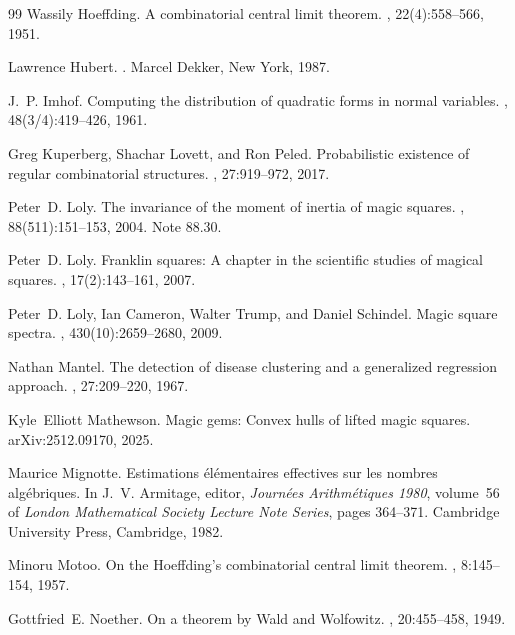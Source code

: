 \documentclass[11pt,a4paper]{article}
\theoremstyle{plain}
\theoremstyle{definition}
\theoremstyle{remark}
\begin{document}
\begin{thebibliography}{99}
Wassily Hoeffding.
\newblock A combinatorial central limit theorem.
, 22(4):558--566, 1951.

Lawrence Hubert.
.
\newblock Marcel Dekker, New York, 1987.

J.~P. Imhof.
\newblock Computing the distribution of quadratic forms in normal variables.
, 48(3/4):419--426, 1961.

Greg Kuperberg, Shachar Lovett, and Ron Peled.
\newblock Probabilistic existence of regular combinatorial structures.
, 27:919--972, 2017.

Peter~D. Loly.
\newblock The invariance of the moment of inertia of magic squares.
, 88(511):151--153, 2004.
\newblock Note 88.30.

Peter~D. Loly.
\newblock Franklin squares: A chapter in the scientific studies of magical
  squares.
, 17(2):143--161, 2007.

Peter~D. Loly, Ian Cameron, Walter Trump, and Daniel Schindel.
\newblock Magic square spectra.
, 430(10):2659--2680, 2009.

Nathan Mantel.
\newblock The detection of disease clustering and a generalized regression
  approach.
, 27:209--220, 1967.

Kyle~Elliott Mathewson.
\newblock Magic gems: Convex hulls of lifted magic squares.
\newblock arXiv:2512.09170, 2025.

Maurice Mignotte.
\newblock Estimations {\'e}l{\'e}mentaires effectives sur les nombres
  alg{\'e}briques.
\newblock In J.~V. Armitage, editor, {\em Journ{\'e}es Arithm{\'e}tiques 1980},
  volume~56 of {\em London Mathematical Society Lecture Note Series}, pages
  364--371. Cambridge University Press, Cambridge, 1982.

Minoru Motoo.
\newblock On the {H}oeffding's combinatorial central limit theorem.
, 8:145--154,
  1957.

Gottfried~E. Noether.
\newblock On a theorem by {W}ald and {W}olfowitz.
, 20:455--458, 1949.


\end{thebibliography}
\end{document}
